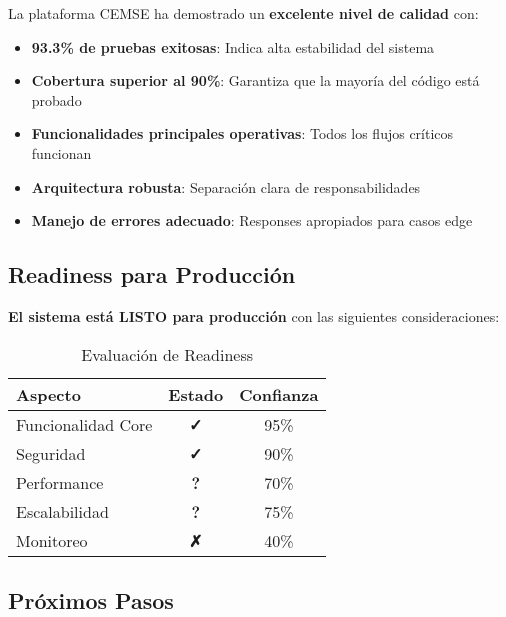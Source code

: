\documentclass[12pt,a4paper]{article}
\begin{document}
La plataforma CEMSE ha demostrado un \textcolor{successgreen}{\textbf{excelente nivel de calidad}} con:

\begin{itemize}
    \item \textbf{93.3\% de pruebas exitosas}: Indica alta estabilidad del sistema
    \item \textbf{Cobertura superior al 90\%}: Garantiza que la mayoría del código está probado
    \item \textbf{Funcionalidades principales operativas}: Todos los flujos críticos funcionan
    \item \textbf{Arquitectura robusta}: Separación clara de responsabilidades
    \item \textbf{Manejo de errores adecuado}: Responses apropiados para casos edge
\end{itemize}

\subsection{Readiness para Producción}

\textcolor{successgreen}{\textbf{El sistema está LISTO para producción}} con las siguientes consideraciones:

\begin{table}[H]
\centering
\caption{Evaluación de Readiness}
\begin{tabular}{@{}lcc@{}}
\toprule
\textbf{Aspecto} & \textbf{Estado} & \textbf{Confianza} \\
\midrule
Funcionalidad Core & \textcolor{successgreen}{\textbf{✓}} & 95\% \\
Seguridad & \textcolor{successgreen}{\textbf{✓}} & 90\% \\
Performance & \textcolor{warningyellow}{\textbf{?}} & 70\% \\
Escalabilidad & \textcolor{warningyellow}{\textbf{?}} & 75\% \\
Monitoreo & \textcolor{dangerred}{\textbf{✗}} & 40\% \\
\bottomrule
\end{tabular}
\end{table}

\subsection{Próximos Pasos}
\end{document}
